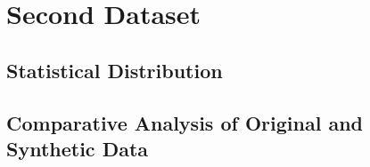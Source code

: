


\section{Second Dataset}

\subsection{Statistical Distribution}

\subsection{Comparative Analysis of Original and Synthetic Data}


